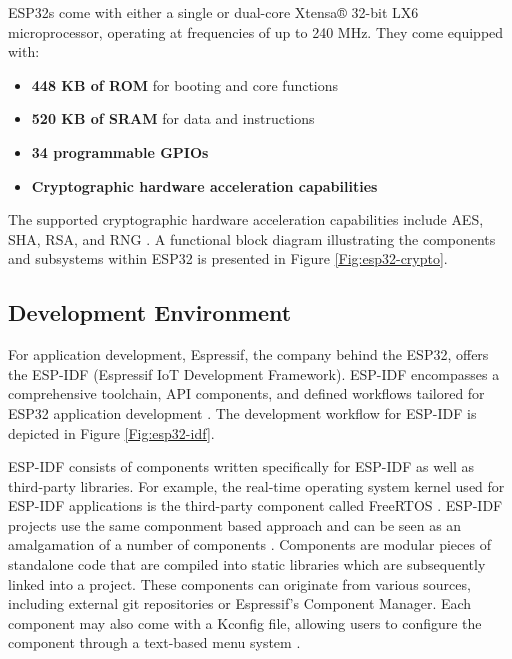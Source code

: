 ESP32s come with either a single or dual-core Xtensa® 32-bit LX6 microprocessor, operating at frequencies of up to 240 MHz. They come equipped with:
\begin{itemize}
    \item \textbf{448 KB of ROM} for booting and core functions \cite[4-5]{esp32-series}
    \item \textbf{520 KB of SRAM} for data and instructions \cite[4-5]{esp32-series}
    \item \textbf{34 programmable GPIOs} \cite[4-5]{esp32-series}
    \item \textbf{Cryptographic hardware acceleration capabilities} \cite[4-5]{esp32-series}
\end{itemize}

The supported cryptographic hardware acceleration capabilities include \ac{AES}, \ac{SHA}, \ac{RSA}, and \ac{RNG} \cite[4-5]{esp32-series}. A functional block diagram illustrating the components and subsystems within ESP32 is presented in Figure \ref{Fig:esp32-crypto}.

\subsection{Development Environment}
For application development, Espressif, the company behind the ESP32, offers the ESP-IDF (Espressif IoT Development Framework). ESP-IDF encompasses a comprehensive toolchain, API components, and defined workflows tailored for ESP32 application development \cite{esp32-prog}. The development workflow for ESP-IDF is depicted in Figure \ref{Fig:esp32-idf}.


ESP-IDF consists of components written specifically for ESP-IDF as well as third-party libraries.\cite{esp-prog} For example, the real-time operating system kernel used for ESP-IDF applications is the third-party component called FreeRTOS \cite{esp-prog} \cite[6]{esp32-module}. ESP-IDF projects use the same componment based approach and can be seen as an amalgamation of a number of components \cite{esp-prog}. Components are modular pieces of standalone code that are compiled into static libraries which are subsequently linked into a project. These components can originate from various sources, including external git repositories or Espressif's Component Manager. Each component may also come with a Kconfig file, allowing users to configure the component through a text-based menu system \cite{esp-prog}.    


